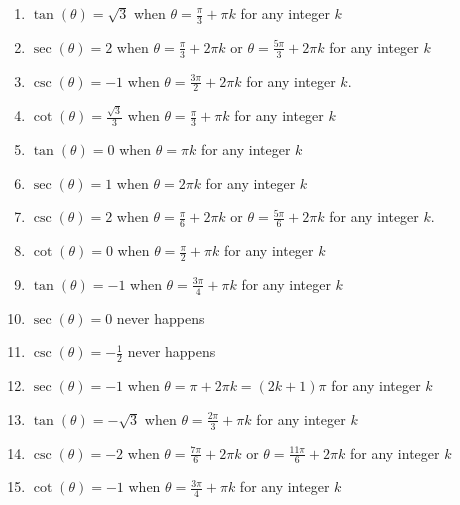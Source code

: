 \documentclass{ximera}
\begin{document}
\begin{enumerate}

\setcounter{enumi}{\value{HW}}

\item $\tan(\theta) = \sqrt{3}$ when $\theta = \frac{\pi}{3} + \pi k$ for any integer $k$
\item $\sec(\theta) = 2$ when $\theta = \frac{\pi}{3} + 2\pi k$ or $\theta = \frac{5\pi}{3} + 2\pi k$ for any integer $k$
\item $\csc(\theta) = -1$ when $\theta = \frac{3\pi}{2} + 2\pi k$ for any integer $k$.
\item $\cot(\theta) = \frac{\sqrt{3}}{3}$ when $\theta = \frac{\pi}{3} + \pi k$ for any integer $k$
\item $\tan(\theta) = 0$ when $\theta = \pi k$ for any integer $k$
\item $\sec(\theta) = 1$ when $\theta = 2\pi k$ for any integer $k$
\item $\csc(\theta) = 2$ when $\theta = \frac{\pi}{6} + 2\pi k$ or $\theta = \frac{5\pi}{6} + 2\pi k$ for any integer $k$.
\item $\cot(\theta) = 0$ when $\theta = \frac{\pi}{2} + \pi k$ for any integer $k$
\item $\tan(\theta) = -1$ when $\theta = \frac{3\pi}{4} + \pi k$ for any integer $k$
\item $\sec(\theta) = 0$ never happens 
\item $\csc(\theta) = -\frac{1}{2}$ never happens
\item  $\sec(\theta) = -1$ when $\theta = \pi + 2\pi k = (2k+1)\pi$ for any integer $k$
\item  $\tan(\theta) = -\sqrt{3}$ when $\theta = \frac{2\pi}{3} + \pi k$ for any integer $k$
\item  $\csc(\theta) = -2$ when $\theta = \frac{7\pi}{6} + 2\pi k$ or $\theta = \frac{11\pi}{6} + 2\pi k$ for any integer $k$
\item  $\cot(\theta) = -1$ when $\theta = \frac{3\pi}{4} + \pi k$ for any integer $k$

\setcounter{HW}{\value{enumi}}

\end{enumerate}
\end{document}
